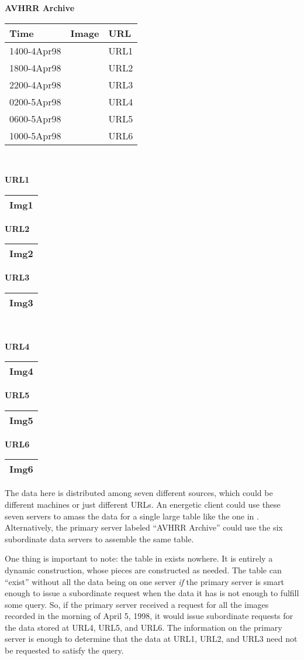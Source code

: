 \documentclass[10pt]{report}
\begin{document}
\begin{center}
\textbf{AVHRR Archive} \\
\begin{tabular}{|l|l|l|} \hline
Time        &Image &URL \\ \hline
1400-4Apr98 &      &URL1 \\
1800-4Apr98 &      &URL2 \\
2200-4Apr98 &      &URL3 \\
0200-5Apr98 &      &URL4 \\
0600-5Apr98 &      &URL5 \\
1000-5Apr98 &      &URL6 \\ \hline
\end{tabular} \\ {\huge\strut}
\textbf{URL1}
\begin{tabular}{|l|} \hline
Img1 \\ \hline
\end{tabular}
\hfill
\textbf{URL2}
\begin{tabular}{|l|} \hline
Img2 \\ \hline
\end{tabular}
\hfill
\textbf{URL3}
\begin{tabular}{|l|} \hline
Img3 \\ \hline
\end{tabular} \\ {\huge\strut} 
\textbf{URL4}
\begin{tabular}{|l|} \hline
Img4 \\ \hline
\end{tabular}
\hfill
\textbf{URL5}
\begin{tabular}{|l|} \hline
Img5 \\ \hline
\end{tabular}
\hfill
\textbf{URL6}
\begin{tabular}{|l|} \hline
Img6 \\ \hline
\end{tabular}
\end{center}

\noindent
The data here is distributed among seven different sources, which
could be different machines or just different URLs.  An energetic
client could use these seven servers to amass the data for a single
large table like the one in .  Alternatively,
the primary server labeled ``AVHRR Archive'' could use the six
subordinate data servers to assemble the same table.

One thing is important to note: the table in 
exists nowhere.  It is entirely a dynamic construction, whose pieces
are constructed as needed.  The table can ``exist'' without all the
data being on one server \emph{if} the primary server is smart enough
to issue a subordinate request when the data it has is not enough to
fulfill some query.  So, if the primary server received a request for
all the images recorded in the morning of April 5, 1998, it would
issue subordinate requests for the data stored at URL4, URL5, and
URL6.  The information on the primary server is enough to determine
that the data at URL1, URL2, and URL3 need not be requested to satisfy
the query.
\end{document}
